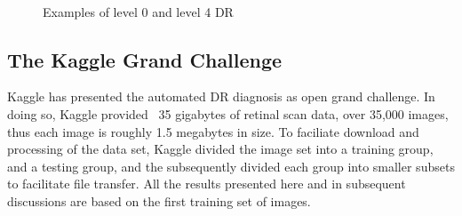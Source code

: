 \documentclass[letterpaper,12pt]{article}
\begin{document}
\begin{figure}[htbp]
\begin{center}
  \ \ \ \ 
\caption{Examples of level 0 and level 4 DR}
\label{marking_image}
\end{center}
\end{figure}

\subsection{The Kaggle Grand Challenge}

Kaggle has presented the automated DR diagnosis as open grand challenge. In doing so, Kaggle provided ~35 gigabytes of retinal scan data, over 35,000 images, thus each image is roughly 1.5 megabytes in size. To faciliate download and processing of the data set, Kaggle divided the image set into a training group, and a testing group, and the subsequently divided each group into smaller subsets to facilitate file transfer. All the results presented here and in subsequent discussions are based on the first training set of images.
\end{document}
